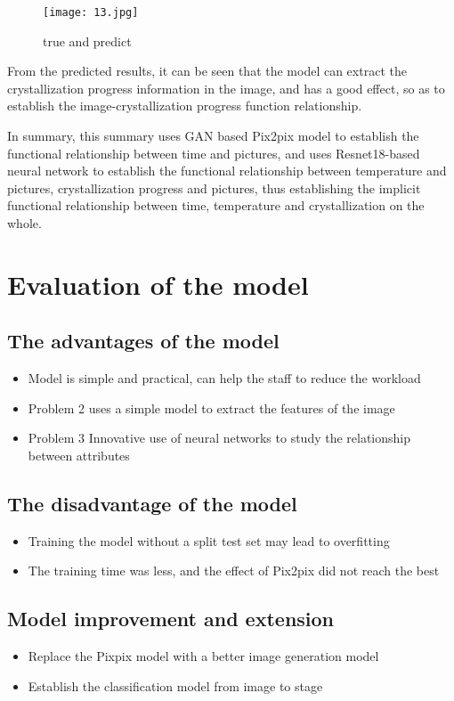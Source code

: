 \documentclass[12pt]{apmcmthesis}
\begin{document}
\begin{figure}[htbp]
	\centering
	\texttt{[image: 13.jpg]}
	\caption{true and predict}
	\label{a}
\end{figure}
From the predicted results, it can be seen that the model can extract the crystallization progress information in the image, and has a good effect, so as to establish the image-crystallization progress function relationship.

In summary, this summary uses GAN based Pix2pix model to establish the functional relationship between time and pictures, and uses Resnet18-based neural network to establish the functional relationship between temperature and pictures, crystallization progress and pictures, thus establishing the implicit functional relationship between time, temperature and crystallization on the whole.

\section{Evaluation of the model}
\subsection{The advantages of the model}
\begin{itemize}
	\item Model is simple and practical, can help the staff to reduce the workload
	\item Problem 2 uses a simple model to extract the features of the image
	\item Problem 3 Innovative use of neural networks to study the relationship between attributes
\end{itemize}
\subsection{The disadvantage of the model}

\begin{itemize}
	\item Training the model without a split test set may lead to overfitting
	\item The training time was less, and the effect of Pix2pix did not reach the best
\end{itemize}

\subsection{Model improvement and extension}
\begin{itemize}
	\item Replace the Pixpix model with a better image generation model
	\item Establish the classification model from image to stage
\end{itemize}
\end{document}

